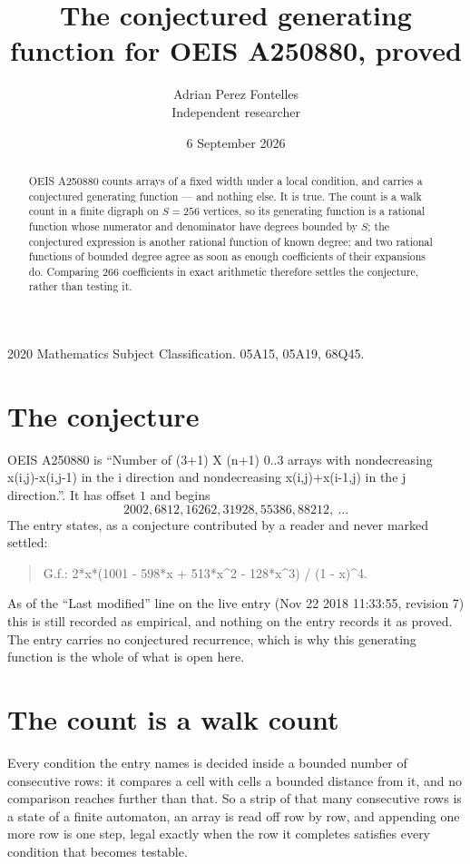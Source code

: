 \documentclass[11pt,a4paper]{article}
\title{The conjectured generating function for OEIS A250880, proved}
\author{Adrian Perez Fontelles\\ \small Independent researcher}
\date{6 September 2026}
\theoremstyle{plain}
\theoremstyle{definition}
\begin{document}
\maketitle

\begin{abstract}
OEIS A250880 counts arrays of a fixed width under a local condition, and carries a conjectured
generating function --- and nothing else. It is true. The count is a walk count in a finite
digraph on $S=256$ vertices, so its generating function is a rational function whose numerator
and denominator have degrees bounded by $S$; the conjectured expression is another rational
function of known degree; and two rational functions of bounded degree agree as soon as enough
coefficients of their expansions do. Comparing $266$ coefficients in exact arithmetic
therefore settles the conjecture, rather than testing it.
\end{abstract}

\noindent\small 2020 Mathematics Subject Classification. 05A15, 05A19, 68Q45.\normalsize

\section{The conjecture}

OEIS A250880 is ``Number of (3+1) X (n+1) 0..3 arrays with nondecreasing x(i,j)-x(i,j-1) in the i direction and nondecreasing x(i,j)+x(i-1,j) in the j direction.''. It has offset $1$ and begins
\[
2002, 6812, 16262, 31928, 55386, 88212,\ \dots
\]
The entry states, as a conjecture contributed by a reader and never marked settled:
\begin{quote}
G.f.: 2*x*(1001 - 598*x + 513*x\^{}2 - 128*x\^{}3) / (1 - x)\^{}4.
\end{quote}
As of the ``Last modified'' line on the live entry (Nov 22 2018 11:33:55, revision 7) this is still
recorded as empirical, and nothing on the entry records it as proved. The entry carries no
conjectured recurrence, which is why this generating function is the whole of what is open
here.

\section{The count is a walk count}

Every condition the entry names is decided inside a bounded number of consecutive rows: it
compares a cell with cells a bounded distance from it, and no comparison reaches further than
that. So a strip of that many consecutive rows is a state of a finite automaton, an array is
read off row by row, and appending one more row is one step, legal exactly when the row it
completes satisfies every condition that becomes testable.
\end{document}
